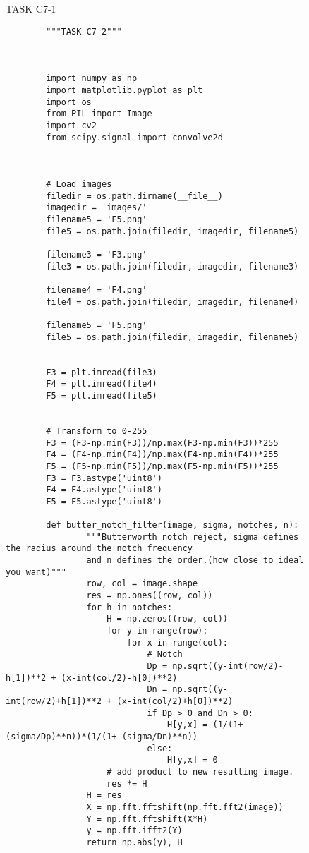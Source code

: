 {\begin{figure}[hbt!]
\begin{lstlisting}
    \end{lstlisting}
\caption{TASK C7-1}
\label{TASK C7-1}
\end{figure}



\begin{figure}[hbt!]
    \begin{lstlisting}
        """TASK C7-2"""



        import numpy as np 
        import matplotlib.pyplot as plt
        import os
        from PIL import Image
        import cv2
        from scipy.signal import convolve2d
        
        
        
        # Load images
        filedir = os.path.dirname(__file__)
        imagedir = 'images/'
        filename5 = 'F5.png'
        file5 = os.path.join(filedir, imagedir, filename5)
        
        filename3 = 'F3.png'
        file3 = os.path.join(filedir, imagedir, filename3)
        
        filename4 = 'F4.png'
        file4 = os.path.join(filedir, imagedir, filename4)
        
        filename5 = 'F5.png'
        file5 = os.path.join(filedir, imagedir, filename5)
        
        
        F3 = plt.imread(file3)
        F4 = plt.imread(file4)
        F5 = plt.imread(file5)
        
        
        # Transform to 0-255
        F3 = (F3-np.min(F3))/np.max(F3-np.min(F3))*255
        F4 = (F4-np.min(F4))/np.max(F4-np.min(F4))*255
        F5 = (F5-np.min(F5))/np.max(F5-np.min(F5))*255
        F3 = F3.astype('uint8')
        F4 = F4.astype('uint8')
        F5 = F5.astype('uint8')
        
        def butter_notch_filter(image, sigma, notches, n):
                """Butterworth notch reject, sigma defines the radius around the notch frequency
                and n defines the order.(how close to ideal you want)"""
                row, col = image.shape
                res = np.ones((row, col))
                for h in notches:
                    H = np.zeros((row, col))
                    for y in range(row):
                        for x in range(col):
                            # Notch
                            Dp = np.sqrt((y-int(row/2)-h[1])**2 + (x-int(col/2)-h[0])**2)
                            Dn = np.sqrt((y-int(row/2)+h[1])**2 + (x-int(col/2)+h[0])**2)
                            if Dp > 0 and Dn > 0:
                                H[y,x] = (1/(1+ (sigma/Dp)**n))*(1/(1+ (sigma/Dn)**n))
                            else:
                                H[y,x] = 0
                    # add product to new resulting image.
                    res *= H
                H = res
                X = np.fft.fftshift(np.fft.fft2(image))
                Y = np.fft.fftshift(X*H)
                y = np.fft.ifft2(Y)
                return np.abs(y), H
        

\end{lstlisting}
\end{figure}}
